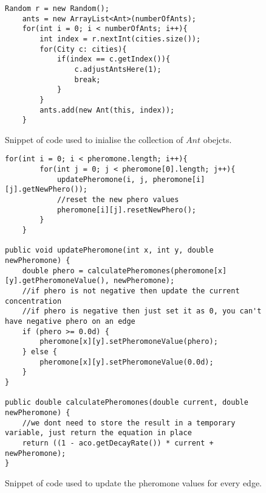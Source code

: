 \begin{figure}[H]
\begin{lstlisting}
Random r = new Random();
	ants = new ArrayList<Ant>(numberOfAnts);
	for(int i = 0; i < numberOfAnts; i++){
		int index = r.nextInt(cities.size());
		for(City c: cities){
			if(index == c.getIndex()){
				c.adjustAntsHere(1);
				break;
			}
		}
		ants.add(new Ant(this, index));
	}
\end{lstlisting}
\caption{Snippet of code used to inialise the collection of $Ant$ obejcts.}
\label{initAnt}
\end{figure}

\begin{figure}[H]
\begin{lstlisting}
for(int i = 0; i < pheromone.length; i++){
		for(int j = 0; j < pheromone[0].length; j++){
			updatePheromone(i, j, pheromone[i][j].getNewPhero());
			//reset the new phero values
			pheromone[i][j].resetNewPhero();
		}
	}

public void updatePheromone(int x, int y, double newPheromone) {
	double phero = calculatePheromones(pheromone[x][y].getPheromoneValue(), newPheromone);
	//if phero is not negative then update the current concentration
	//if phero is negative then just set it as 0, you can't have negative phero on an edge
	if (phero >= 0.0d) {
		pheromone[x][y].setPheromoneValue(phero);
	} else {
		pheromone[x][y].setPheromoneValue(0.0d);
	}
}

public double calculatePheromones(double current, double newPheromone) {
	//we dont need to store the result in a temporary variable, just return the equation in place
	return ((1 - aco.getDecayRate()) * current + newPheromone);
}	
\end{lstlisting}
\caption{Snippet of code used to update the pheromone values for every edge.}
\label{codephero}
\end{figure}

